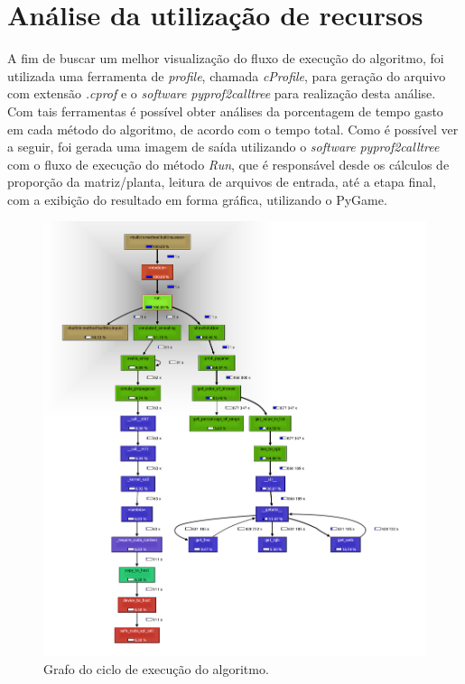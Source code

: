 \documentclass[
	12pt,				%
	twoside,			%
	a4paper,			%
	english,			%
	french,				%
	spanish,			%
	brazil				%
	]{abntex2}
\begin{document}
\section{Análise da utilização de
recursos}\label{anuxe1lise-da-utilizauxe7uxe3o-de-recursos}

A fim de buscar um melhor visualização do fluxo de execução do
algoritmo, foi utilizada uma ferramenta de \emph{profile}, chamada
\emph{cProfile}, para geração do arquivo com extensão \emph{.cprof} e o
\emph{software} \emph{pyprof2calltree} para realização desta análise.
Com tais ferramentas é possível obter análises da porcentagem de tempo
gasto em cada método do algoritmo, de acordo com o tempo total. Como é
possível ver a seguir, foi gerada uma imagem de saída utilizando o
\emph{software} \emph{pyprof2calltree} com o fluxo de execução do método
\emph{Run}, que é responsável desde os cálculos de proporção da
matriz/planta, leitura de arquivos de entrada, até a etapa final, com a
exibição do resultado em forma gráfica, utilizando o PyGame.

\begin{figure}[ht]
    \caption{\label{cprofile} Grafo do ciclo de execução do algoritmo.}
    \begin{center}
        \includegraphics[scale=0.48]{imagens/graph.jpg}
    \end{center}
\end{figure}
\end{document}
